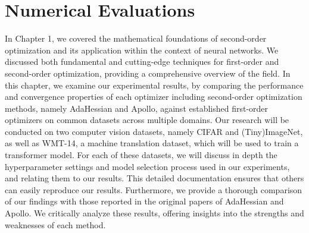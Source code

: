 \chapter{Numerical Evaluations}\label{ch:examples}

In Chapter 1, we covered the mathematical foundations of second-order optimization
and its application within the context of neural networks.
We discussed both fundamental and cutting-edge techniques for first-order and
second-order optimization, providing a comprehensive overview of the field.
In this chapter, we examine our experimental results, by comparing the performance and convergence properties of each
optimizer including second-order optimization methods, namely
AdaHessian\cite{yao2021adahessian} and Apollo\cite{apollo}, against established first-order optimizers on common datasets across multiple domains.
Our research will be conducted on two computer vision datasets,
namely CIFAR and (Tiny)ImageNet, as well as WMT-14, a machine translation dataset, which will
be used to train a transformer model.
For each of these datasets, we will discuss in depth the hyperparameter settings
 and model selection process used in our experiments, and relating them to our results.
This detailed documentation ensures that others can easily reproduce our results.
Furthermore, we provide a thorough comparison of our findings with those reported 
in the original papers of AdaHessian and Apollo. We critically analyze
these results, offering insights into the strengths and weaknesses of each method.

